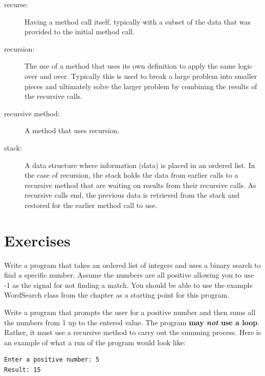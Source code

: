 \begin{description}

\item[recurse:] Having a method call itself, typically with a subset of the data that was provided to the initial method call. 

\item[recursion:] The use of a method that uses its own definition to apply the same logic over and over. Typically this is used to break a large problem into smaller pieces and ultimately solve the larger problem by combining the results of the recursive calls.

\item[recursive method:] A method that uses recursion.

\item[stack:] A data structure where information (data) is placed in an ordered list. In the case of recursion, the stack holds the data from earlier calls to a recursive method that are waiting on results from their recursive calls. As recursive calls end, the previous data is retrieved from the stack and restored for the earlier method call to use.

\end{description}

\newpage

\section{Exercises}

\begin{ex}
Write a program that takes an ordered list of integers and uses a binary search to find a specific number. Assume the numbers are all positive allowing you to use -1 as the signal for not finding a match. You should be able to use the example WordSearch class from the chapter as a starting point for this program.
\end{ex}

\begin{ex}
Write a program that prompts the user for a positive number and then sums all the numbers from 1 up to the entered value. The program \textbf{may \textit{not} use a loop}. Rather, it must use a recursive method to carry out the summing process.
Here is an example of what a run of the program would look like:

\beforeverb
\begin{verbatim}
Enter a positive number: 5
Result: 15
\end{verbatim}
\afterverb

\end{ex}


